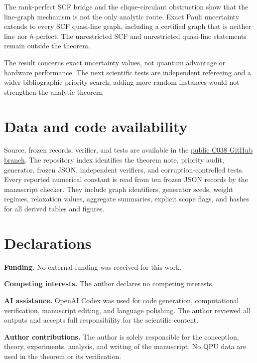 \documentclass[11pt,a4paper]{article}
\theoremstyle{remark}
\begin{document}
The rank-perfect SCF bridge and the clique-circulant obstruction show that the
line-graph mechanism is not the only analytic route. Exact Pauli uncertainty
extends to every SCF quasi-line graph, including a certified graph that is
neither line nor $h$-perfect. The unrestricted SCF and unrestricted
quasi-line statements remain outside the theorem.

The result concerns exact uncertainty values, not quantum advantage or hardware
performance. The next scientific tests are independent refereeing and a wider
bibliographic priority search; adding more random instances would not strengthen
the analytic theorem.

\section*{Data and code availability}

Source, frozen records, verifier, and tests are available in the
\href{https://github.com/YaroslavPelekhov/Quantum/tree/research/c038-line-graph-hbar}{public C038 GitHub branch}.
The repository index identifies the theorem note, priority audit, generator,
frozen JSON, independent verifiers, and corruption-controlled tests. Every
reported numerical constant is read from ten frozen JSON records by the
manuscript checker. They include graph identifiers, generator seeds, weight
regimes, relaxation values, aggregate summaries, explicit scope flags, and
hashes for all derived tables and figures.

\section*{Declarations}

\noindent\textbf{Funding.}
No external funding was received for this work.

\noindent\textbf{Competing interests.}
The author declares no competing interests.

\noindent\textbf{AI assistance.}
OpenAI Codex was used for code generation, computational verification,
manuscript editing, and language polishing. The author reviewed all outputs
and accepts full responsibility for the scientific content.

\noindent\textbf{Author contributions.}
The author is solely responsible for the conception, theory, experiments,
analysis, and writing of the manuscript. No QPU data are used in the theorem
or its verification.
\end{document}
